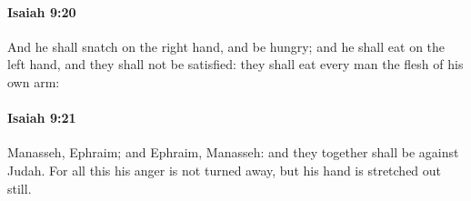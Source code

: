		\paragraph{Isaiah 9:20} %
			\label{ISAIAH-9-20}

			And he shall snatch on the right hand, and be hungry; and he shall eat on the left hand, and they shall not be satisfied: they shall eat every man the flesh of his own arm:


		\paragraph{Isaiah 9:21} %
			\label{ISAIAH-9-21}

			Manasseh, Ephraim; and Ephraim, Manasseh: and they together shall be against Judah. For all this his anger is not turned away, but his hand is stretched out still.

